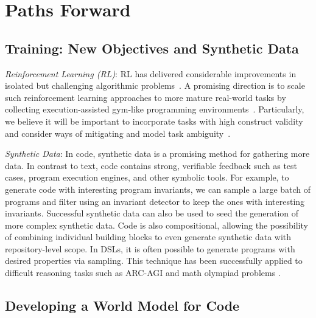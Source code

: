 \section{Paths Forward} \label{sec:main-paths}




\subsection{Training: New Objectives and Synthetic Data}


\textit{Reinforcement Learning (RL)}: 
RL has delivered considerable improvements in isolated but challenging algorithmic  problems~\cite{deepseekai2025deepseekr1}.
A promising direction is to scale such reinforcement learning approaches to more mature real-world tasks by collecting execution-assisted gym-like programming environments~\cite{jain2024r2e, pan2024trainingsoftwareengineeringagents}.
Particularly, we believe it will be important to incorporate tasks with high construct validity and consider ways of mitigating and model task ambiguity~\cite{shao2024collaborativegym}.



\textit{Synthetic Data}: In code, synthetic data is a promising method for gathering more data. In contrast to text, code contains strong, verifiable feedback such as test cases, program execution engines, and other symbolic tools. For example, to generate code with interesting program invariants, we can sample a large batch of programs and filter using an invariant detector to keep the ones with interesting invariants. Successful synthetic data can also be used to seed the generation of more complex synthetic data. Code is also compositional, allowing the possibility of combining individual building blocks to even generate synthetic data with repository-level scope. In DSLs, it is often possible to generate programs with desired properties via sampling. This technique has been successfully applied to difficult reasoning tasks such as ARC-AGI \citep{li2024combining} and math olympiad problems \citep{trinh2024solving, deepmindalphaproof}.

\subsection{Developing a World Model for Code}

